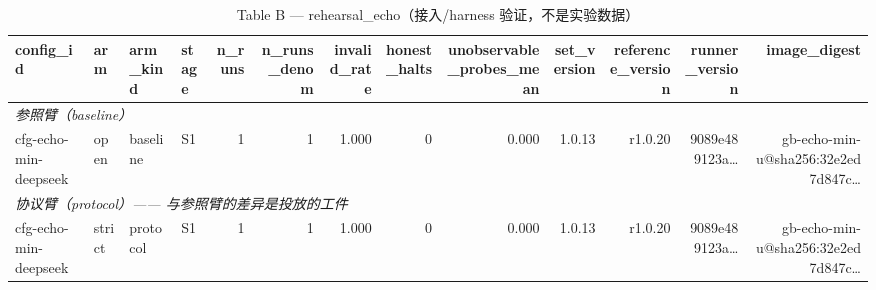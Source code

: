 \begin{table}[t]
\centering
\caption{Table B — rehearsal\_echo（接入/harness 验证，不是实验数据）}
\label{tab:b-rehearsal_echo}
\begin{tabular}{llllrrrrrrrrr}
\toprule
config\_id & arm & arm\_kind & stage & n\_runs & n\_runs\_denom & invalid\_rate & honest\_halts & unobservable\_probes\_mean & set\_version & reference\_version & runner\_version & image\_digest \\
\midrule
\multicolumn{13}{l}{\textit{参照臂（baseline）}} \\
cfg-echo-min-deepseek & open & baseline & S1 & 1 & 1 & 1.000 & 0 & 0.000 & 1.0.13 & r1.0.20 & 9089e489123a… & gb-echo-min-u@sha256:32e2ed7d847c… \\
\midrule
\multicolumn{13}{l}{\textit{协议臂（protocol）—— 与参照臂的差异是投放的工件}} \\
cfg-echo-min-deepseek & strict & protocol & S1 & 1 & 1 & 1.000 & 0 & 0.000 & 1.0.13 & r1.0.20 & 9089e489123a… & gb-echo-min-u@sha256:32e2ed7d847c… \\
\bottomrule
\end{tabular}
\end{table}
